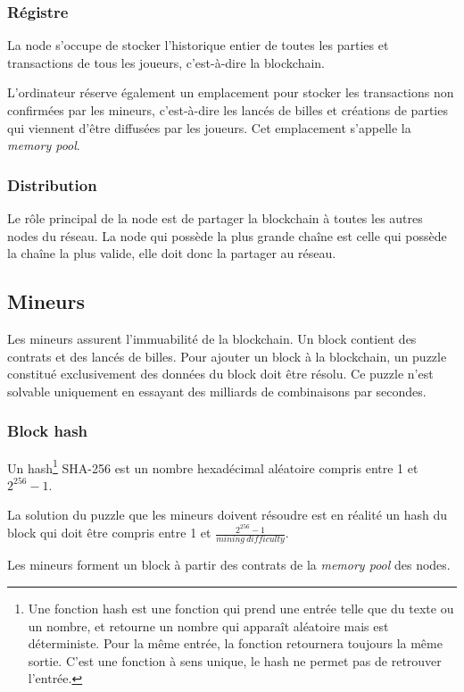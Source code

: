 \documentclass{article}
\begin{document}
\subsubsection{Régistre}
La node s'occupe de stocker l'historique entier de toutes les parties et transactions de tous les joueurs, c'est-à-dire la blockchain.

L'ordinateur réserve également un emplacement pour stocker les transactions non confirmées par les mineurs, c'est-à-dire les lancés de billes et créations de parties qui viennent d'être diffusées par les joueurs. Cet emplacement s'appelle la \textit{memory pool}.

\subsubsection{Distribution}
Le rôle principal de la node est de partager la blockchain à toutes les autres nodes du réseau. 
La node qui possède la plus grande chaîne est celle qui possède la chaîne la plus valide, elle doit donc la partager au réseau.

\subsection{Mineurs}
Les mineurs assurent l'immuabilité de la blockchain.
Un block contient des contrats et des lancés de billes. Pour ajouter un block à la blockchain, un puzzle constitué exclusivement des données du block doit être résolu. Ce puzzle n'est solvable uniquement en essayant des milliards de combinaisons par secondes.

\subsubsection{Block hash}

Un hash\footnote{Une fonction hash est une fonction qui prend une entrée telle que du texte ou un nombre, et retourne un nombre qui apparaît aléatoire mais est déterministe. Pour la même entrée, la fonction retournera toujours la même sortie. C'est une fonction à sens unique, le hash ne permet pas de retrouver l'entrée.} SHA-256 est un nombre hexadécimal aléatoire compris entre 1 et $2^{256} - 1$.

La solution du puzzle que les mineurs doivent résoudre est en réalité un hash du block qui doit être compris entre 1 et $\frac{2^{256}-1}{mining\ difficulty}$.

Les mineurs forment un block à partir des contrats de la \textit{memory pool} des nodes.
\end{document}
